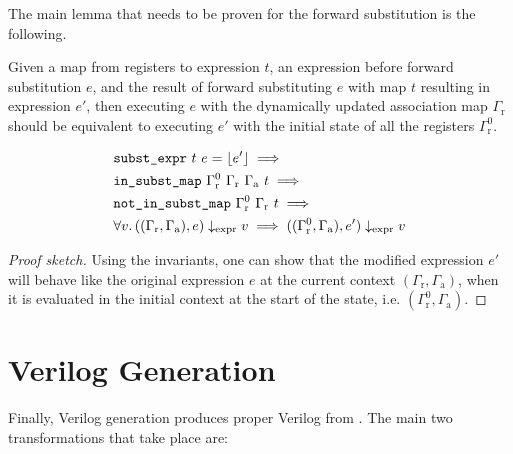 The main lemma that needs to be proven for the forward substitution is the
following.

\begin{lemma}%
  \label{lem:hg:forward-substitution-of-expressions}

  Given a map from registers to expression $t$, an expression before forward
  substitution $e$, and the result of forward substituting $e$ with map $t$
  resulting in expression $e'$, then executing $e$ with the dynamically updated
  association map $\Gamma_{\mathrm r}$ should be equivalent to executing $e'$
  with the initial state of all the registers $\Gamma^{0}_{\mathrm r}$.

  {\normalfont
    \begin{equation*}
      \begin{aligned}
        &\texttt{subst\_expr}\ t\ e = \lfloor e' \rfloor \implies \\
        &\texttt{in\_subst\_map}\ \Gamma^{0}_{\mathrm r}\ \Gamma_{\mathrm r}\ \Gamma_{\mathrm a}\ t \implies\\
        &\texttt{not\_in\_subst\_map}\ \Gamma^{0}_{\mathrm r}\ \Gamma_{\mathrm r}\ t \implies\\
        &\forall v\ldotp ((\Gamma_{\mathrm r}, \Gamma_{\mathrm a}), e) \downarrow_{\text{expr}} v
          \implies ((\Gamma^{0}_{\mathrm r}, \Gamma_{\mathrm a}), e') \downarrow_{\text{expr}} v
      \end{aligned}
    \end{equation*}}

  \begin{proof}[Proof sketch]
    Using the invariants, one can show that the modified expression $e'$ will
    behave like the original expression $e$ at the current context
    $(\Gamma_{\mathrm r}, \Gamma_{\mathrm a})$, when it is evaluated in the
    initial context at the start of the state, i.e.
    $(\Gamma^{0}_{\mathrm r}, \Gamma_{\mathrm a})$.
  \end{proof}
\end{lemma}


\section{Verilog Generation}%
\label{sec:hg:verilog-generation}

Finally, Verilog generation produces proper Verilog from \htl{}.  The main two
transformations that take place are:

